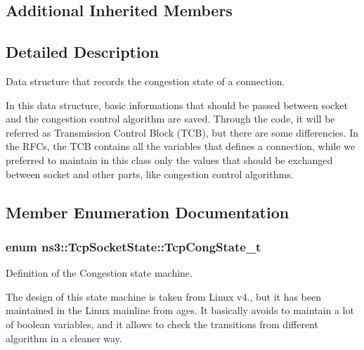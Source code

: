 \subsection*{Additional Inherited Members}


\subsection{Detailed Description}
Data structure that records the congestion state of a connection. 

In this data structure, basic informations that should be passed between socket and the congestion control algorithm are saved. Through the code, it will be referred as Transmission Control Block (T\+CB), but there are some differencies. In the R\+F\+Cs, the T\+CB contains all the variables that defines a connection, while we preferred to maintain in this class only the values that should be exchanged between socket and other parts, like congestion control algorithms. 

\subsection{Member Enumeration Documentation}
\subsubsection[{\texorpdfstring{Tcp\+Cong\+State\+\_\+t}{TcpCongState_t}}]{\setlength{\rightskip}{0pt plus 5cm}enum {\bf ns3\+::\+Tcp\+Socket\+State\+::\+Tcp\+Cong\+State\+\_\+t}}\hypertarget{classns3_1_1TcpSocketState_a6fc313945a33d48fd60cbffe0c787b19}{}\label{classns3_1_1TcpSocketState_a6fc313945a33d48fd60cbffe0c787b19}


Definition of the Congestion state machine. 

The design of this state machine is taken from Linux v4., but it has been maintained in the Linux mainline from ages. It basically avoids to maintain a lot of boolean variables, and it allows to check the transitions from different algorithm in a cleaner way.

